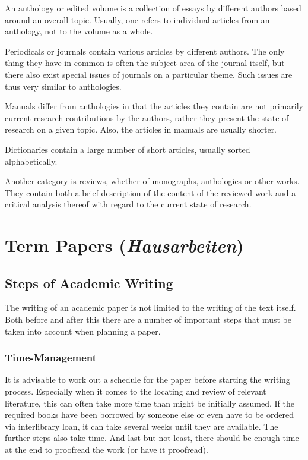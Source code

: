 \documentclass[
  english,
]{scrreprt}
\begin{document}
An anthology or edited volume is a collection of essays by different authors based around an overall topic. Usually, one refers to individual articles from an anthology, not to the volume as a whole.

Periodicals or journals contain various articles by different authors. The only thing they have in common is often the subject area of the journal itself, but there also exist special issues of journals on a particular theme. Such issues are thus very similar to anthologies.

Manuals differ from anthologies in that the articles they contain are not primarily current research contributions by the authors, rather they present the state of research on a given topic. Also, the articles in manuals are usually shorter.

Dictionaries contain a large number of short articles, usually sorted alphabetically.

Another category is reviews, whether of monographs, anthologies or other works. They contain both a brief description of the content of the reviewed work and a critical analysis thereof with regard to the current state of research.

\chapter{\texorpdfstring{Term Papers (\emph{Hausarbeiten})}{Term Papers (Hausarbeiten)}}\label{sec:term_papers}

\section{Steps of Academic Writing}\label{sec:steps}

The writing of an academic paper is not limited to the writing of the text itself. Both before and after this there are a number of important steps that must be taken into account when planning a paper.

\subsection{Time-Management}\label{time-management}

It is advisable to work out a schedule for the paper before starting the writing process. Especially when it comes to the locating and review of relevant literature, this can often take more time than might be initially assumed. If the required books have been borrowed by someone else or even have to be ordered via interlibrary loan, it can take several weeks until they are available. The further steps also take time. And last but not least, there should be enough time at the end to proofread the work (or have it proofread).
\end{document}
